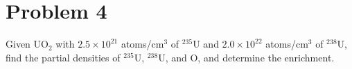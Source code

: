 \section*{Problem 4}

Given UO$_2$ with $2.5 \times 10^{21}$ atoms/cm$^3$ of $^{235}$U and $2.0\times10^{22}$ atoms/cm$^3$ of $^{238}$U, find the partial densities of $^{235}$U, $^{238}$U, and O, and determine the enrichment.

